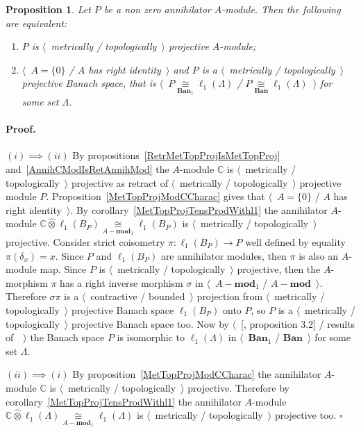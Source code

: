 \documentclass[12pt]{article}
\newcommand{\projtens}{\mathbin{\widehat{\otimes}}}
\newcommand{\isom}[1]{\mathop{\mathbin{\cong}}\limits_{#1}}
\newtheorem{proposition}[theorem]{Proposition}
\renewenvironment{proof}{\paragraph{Proof.}}{\hfill$\square$\medskip}
\begin{document}
\begin{proposition}\label{MetTopProjOfAnnihModCharac} Let $P$ be a non zero
    annihilator $A$-module. Then the following are equivalent:
    \begin{enumerate}[label = (\roman*)]
        \item $P$ is $\langle$~metrically / topologically~$\rangle$ projective
              $A$-module;

        \item $\langle$~$A=\{0\}$ / $A$ has right identity~$\rangle$ and $P$ is
              a $\langle$~metrically / topologically~$\rangle$ projective Banach
              space, that is $\langle$~$P\isom{\mathbf{Ban}_1}\ell_1(\Lambda)$ /
              $P\isom{\mathbf{Ban}}\ell_1(\Lambda)$~$\rangle$ for some set
              $\Lambda$.
    \end{enumerate}
\end{proposition}
\begin{proof} $(i) \implies (ii)$ By
    propositions~\ref{RetrMetTopProjIsMetTopProj}
    and~\ref{AnnihCModIsRetAnnihMod} the $A$-module $\mathbb{C}$ is
    $\langle$~metrically / topologically~$\rangle$ projective as retract of
    $\langle$~metrically / topologically~$\rangle$ projective module $P$.
    Proposition~\ref{MetTopProjModCCharac} gives that $\langle$~$A=\{0\}$ / $A$
    has right identity~$\rangle$.  By corollary~\ref{MetTopProjTensProdWithl1}
    the annihilator $A$-module
    $\mathbb{C}\projtens\ell_1(B_P)\isom{A-\mathbf{mod}_1}\ell_1(B_P)$ is
    $\langle$~metrically / topologically~$\rangle$ projective. Consider strict
    coisometry $\pi:\ell_1(B_P)\to P$ well defined by equality
    $\pi(\delta_x)=x$. Since $P$ and $\ell_1(B_P)$ are annihilator modules, then
    $\pi$ is also an $A$-module map. Since $P$ is $\langle$~metrically /
    topologically~$\rangle$ projective, then the $A$-morphism $\pi$ has a right
    inverse morphism $\sigma$ in 
    $\langle$~$A-\mathbf{mod}_1$ / $A-\mathbf{mod}$~$\rangle$.
    Therefore $\sigma\pi$ is a $\langle$~contractive / bounded~$\rangle$
    projection from $\langle$~metrically / topologically~$\rangle$ projective
    Banach space $\ell_1(B_P)$ onto $P$, so $P$ is a $\langle$~metrically /
    topologically~$\rangle$ projective Banach space too. Now by
    $\langle$~[\cite{HelMetrFrQMod}, proposition 3.2] / results
    of~\cite{KotheTopProjBanSp}~$\rangle$ the Banach space $P$ is isomorphic to
    $\ell_1(\Lambda)$ in $\langle$~$\mathbf{Ban}_1$ / $\mathbf{Ban}$~$\rangle$
    for some set $\Lambda$.

    $(ii) \implies (i)$ By proposition~\ref{MetTopProjModCCharac} the
    annihilator $A$-module $\mathbb{C}$ is $\langle$~metrically /
    topologically~$\rangle$ projective. Therefore by
    corollary~\ref{MetTopProjTensProdWithl1} the annihilator $A$-module
    $\mathbb{C}\projtens\ell_1(\Lambda)\isom{A-\mathbf{mod}_1}\ell_1(\Lambda)$ 
    is $\langle$~metrically / topologically~$\rangle$ projective too.
\end{proof}
\end{document}
